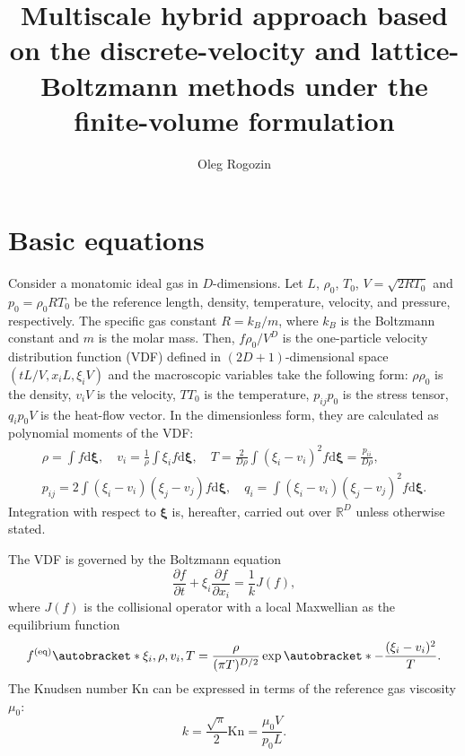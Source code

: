 \documentclass{article}
\title{Multiscale hybrid approach based on the discrete-velocity and lattice-Boltzmann methods under the finite-volume formulation}
\author{Oleg Rogozin}
\newcommand{\Kn}{\mathrm{Kn}}
\newcommand{\dd}{\mathrm{d}}
\newcommand{\pder}[2][]{\frac{\partial#1}{\partial#2}}
\DeclarePairedDelimiter\autobracket()       %
\newcommand{\br}[1]{\autobracket*{#1}}
\newcommand{\dxi}{\boldsymbol{\dd\xi}}
\newcommand{\bxi}{{\boldsymbol{\xi}}}
\newcommand{\equil}[1]{#1^\mathrm{(eq)}}
\newcommand{\refer}[1]{#1_0}
\begin{document}
\maketitle
\tableofcontents

\section{Basic equations}\label{sec:equations}

Consider a monatomic ideal gas in \(D\)-dimensions.
Let \(L\), \(\refer\rho\), \(\refer{T}\), \(V = \sqrt{2R\refer{T}}\) and \(\refer{p} = \refer{\rho}R\refer{T}\) be
the reference length, density, temperature, velocity, and pressure, respectively.
The specific gas constant \(R = k_B/m\), where \(k_B\) is the Boltzmann constant and \(m\) is the molar mass.
Then, \(f\refer{\rho}/V^D\) is the one-particle velocity distribution function (VDF)
defined in \((2D+1)\)-dimensional space \((tL/V, x_iL, \xi_iV)\) and
the macroscopic variables take the following form:
\(\rho\refer{\rho}\) is the density, \(v_iV\) is the velocity, \(T\refer{T}\) is the temperature,
\(p_{ij}\refer{p}\) is the stress tensor, \(q_i\refer{p}V\) is the heat-flow vector.
In the dimensionless form, they are calculated as polynomial moments of the VDF:
\begin{equation}\label{eq:macro}
    \begin{gathered}
    \rho = \int f \dxi, \quad
    v_i = \frac1{\rho} \int \xi_i f \dxi, \quad
    T = \frac{2}{D\rho}\int(\xi_i-v_i)^2 f \dxi = \frac{p_{ii}}{D\rho}, \\
    p_{ij} = 2 \int(\xi_i-v_i)(\xi_j-v_j) f \dxi, \quad
    q_i = \int(\xi_i-v_i)(\xi_j-v_j)^2 f \dxi.
    \end{gathered}
\end{equation}
Integration with respect to \(\bxi\) is, hereafter, carried out over \(\mathbb{R}^D\) unless otherwise stated.

The VDF is governed by the Boltzmann equation
\begin{equation}\label{eq:Boltzmann}
    \pder[f]{t} + \xi_i\pder[f]{x_i} = \frac1kJ(f),
\end{equation}
where \(J(f)\) is the collisional operator with a local Maxwellian as the equilibrium function
\begin{equation}\label{eq:equilibrium}
    \equil{f}\br{\xi_i,\rho,v_i,T} = \frac{\rho}{(\pi T)^{D/2}}\exp\br{-\frac{(\xi_i - v_i)^2}T}.
\end{equation}
The Knudsen number \(\Kn\) can be expressed in terms of the reference gas viscosity \(\refer\mu\):
\begin{equation}\label{eq:Knudsen_number}
    k = \frac{\sqrt\pi}2\Kn = \frac{\refer\mu V}{\refer{p}L}.
\end{equation}
\end{document}
